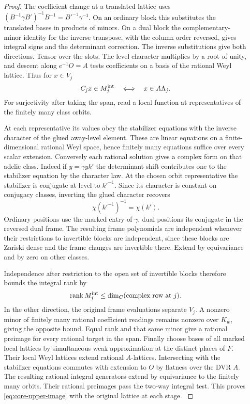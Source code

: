 \begin{proof}
The coefficient change at a translated lattice uses
\((B^{-1}\gamma B')^{-1}B^{-1}=B'^{-1}\gamma^{-1}\).
On an ordinary block this substitutes the translated bases
in products of minors. On a dual block the complementary-minor
identity for the inverse transpose, with the column order
reversed, gives integral signs and the determinant correction.
The inverse substitutions give both directions. Tensor over
the slots. The level character multiplies by a root of unity,
and descent along \(e^{-1}O=A\) tests coefficients on a basis
of the rational Weyl lattice. Thus for \(x\in V_j\)
\[
             C_jx\in M_j^{\rm int}\quad\Longleftrightarrow\quad
             x\in A\Lambda_j .
\]
For surjectivity after taking the span, read a local function
at representatives of the finitely many class orbits.

At each
representative its values obey the stabilizer equations with
the inverse character of the glued away-level element. These
are linear equations on a finite-dimensional rational Weyl
space, hence finitely many equations suffice over every scalar
extension. Conversely each rational solution gives a complex
form on that adelic class. Indeed if \(y=\gamma yk'\) the
determinant shift contributes one to the stabilizer equation
by the character law. At the chosen orbit representative the stabilizer is conjugate at level to \(k'^{-1}\). Since its character is constant on conjugacy classes, inverting the glued character recovers
\[
 \chi(k'^{-1})^{-1}=\chi(k').
\] Ordinary positions use the
marked entry of \(\gamma\), dual positions its conjugate in
the reversed dual frame. The resulting frame polynomials are
independent whenever their restrictions to invertible blocks
are independent, since these blocks are Zariski dense and the
frame changes are invertible there. Extend by equivariance and
by zero on other classes.

Independence after restriction to the open set of invertible blocks therefore bounds the integral rank by
\[
 \operatorname{rank} M_j^{\rm int}\le \dim_{\mathbb C}(\text{complex row at }j).
\] In the other direction, the original
frame evaluations separate \(V_j\). A nonzero minor of finitely
many rational coefficient readings remains nonzero over \(K_w\),
giving the opposite bound. Equal rank and that same minor give
a rational preimage for every rational target in the span.
Finally choose bases of all marked local lattices by simultaneous
weak approximation at the distinct places of \(F\). Their local
Weyl lattices extend rational \(A\)-lattices. Intersecting with
the stabilizer equations commutes with extension to \(O\) by
flatness over the DVR \(A\). The resulting rational integral
generators extend by equivariance to the finitely many orbits.
Their rational preimages pass the two-way integral test. This
proves \eqref{eq:core-upper-image} with the original lattice at
each stage. \cite{companion-selected-core}\label{cor:level-four-core-11}


\end{proof}

